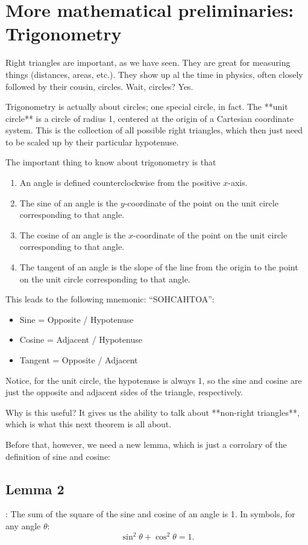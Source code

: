 \documentclass{handout}
\begin{document}
\section{More mathematical preliminaries: Trigonometry}
Right triangles are important, as we have seen. They are great for measuring things (distances, areas, etc.). They show up al the time in physics, often closely followed by their cousin, circles. Wait, circles? Yes. 

Trigonometry is actually about circles; one special circle, in fact. The **unit circle** is a circle of radius 1, centered at the origin of a Cartesian coordinate system. This is the collection of all possible right triangles, which then just need to be scaled up by their particular hypotenuse.

The important thing to know about trigonometry is that
\begin{enumerate}
    \item An angle is defined counterclockwise from the positive $x$-axis.
    \item The sine of an angle is the $y$-coordinate of the point on the unit circle corresponding to that angle.
    \item The cosine of an angle is the $x$-coordinate of the point on the unit circle corresponding to that angle.
    \item The tangent of an angle is the slope of the line from the origin to the point on the unit circle corresponding to that angle.
\end{enumerate}
This leads to the following mnemonic: ``SOHCAHTOA'':
\begin{itemize}
    \item Sine = Opposite / Hypotenuse
    \item Cosine = Adjacent / Hypotenuse
    \item Tangent = Opposite / Adjacent
\end{itemize}

Notice, for the unit circle, the hypotenuse is always 1, so the sine and cosine are just the opposite and adjacent sides of the triangle, respectively. 

Why is this useful? It gives us the ability to talk about **non-right triangles**, which is what this next theorem is all about.

Before that, however, we need a new lemma, which is just a corrolary of the definition of sine and cosine:
\subsection{Lemma 2}: The sum of the square of the sine and cosine of an angle is 1. In symbols, for any angle $\theta$:
$$\sin^2 \theta + \cos^2 \theta = 1.$$
\end{document}
